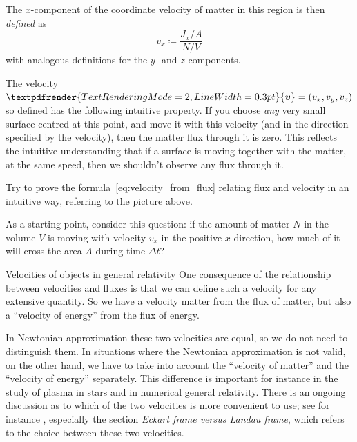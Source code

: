 \documentclass[a4paper,12pt,%
onecolumn,oneside,titlepage,%
british%
]{memoir}
\renewcommand*{\bm}[1]{\textpdfrender{TextRenderingMode=2,LineWidth=0.3pt}{\boldsymbol{#1}}}
\newcommand*{\incr}{\Delta}%
\newcommand*{\defd}{\coloneqq}
\renewcommand*{\|}[1][]{\nonscript\:#1\vert\nonscript\:\mathopen{}}
\newcommand*{\yv}{\bm{v}}
\newcommand*{\yN}{N}
\newcommand*{\Dt}{\incr t}
\begin{document}
The $x$-component of the coordinate velocity of matter in this region is then \emph{defined} as
\begin{equation}
  \label{eq:velocity_from_flux}
  v_{x} \defd \frac{J_{x}/A}{\yN/V}
\end{equation}
with analogous definitions for the $y$- and $z$-components.


The velocity $\yv=(v_{x}, v_{y}, v_{z})$ so defined has the following intuitive property. If you choose \emph{any} very small surface centred at this point, and move it with this velocity (and in the direction specified by the velocity), then the matter flux through it is zero. This reflects the intuitive understanding that if a surface is moving together with the matter, at the same speed, then we shouldn't observe any flux through it.

\begin{exercise}
  Try to prove the formula~\eqref{eq:velocity_from_flux} relating flux and velocity in an intuitive way, referring to the picture above.

  As a starting point, consider this question: if the amount of matter $\yN$ in the volume $V$ is moving with velocity $v_{x}$ in the positive-$x$ direction, how much of it will cross the area $A$ during time $\Dt$?
\end{exercise}

\medskip


\begin{extra}{Velocities of objects in general relativity}
  One consequence of the relationship between velocities and fluxes is that we can define such a velocity for any extensive quantity. So we have a velocity matter from the flux of matter, but also a \enquote{velocity of energy} from the flux of energy.

  In Newtonian approximation these two velocities are equal, so we do not need to distinguish them. In situations where the Newtonian approximation is not valid, on the other hand, we have to take into account the \enquote{velocity of matter} and the \enquote{velocity of energy} separately. This difference is important for instance in the study of plasma in stars and in numerical general relativity. There is an ongoing discussion as to which of the two velocities is more convenient to use; see for instance \cites{kandusetal2008}, especially the section \emph{Eckart frame versus Landau frame}, which refers to the choice between these two velocities.
\end{extra}
\end{document}

